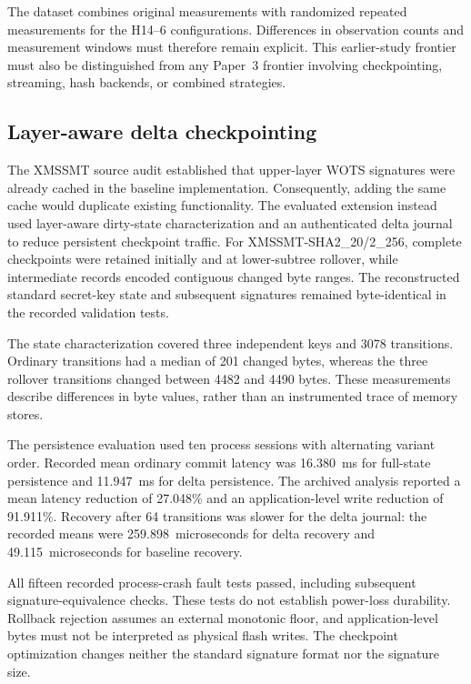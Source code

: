 \documentclass[pdflatex,sn-mathphys-num]{sn-jnl}
\begin{document}
The dataset combines original measurements with randomized repeated
measurements for the H14--6 configurations. Differences in observation
counts and measurement windows must therefore remain explicit.
This earlier-study frontier must also be distinguished from any
Paper~3 frontier involving checkpointing, streaming, hash backends,
or combined strategies.

\subsection{Layer-aware delta checkpointing}
\label{subsec:delta_checkpoint_review}

The XMSSMT source audit established that upper-layer WOTS signatures
were already cached in the baseline implementation. Consequently, adding
the same cache would duplicate existing functionality. The evaluated
extension instead used layer-aware dirty-state characterization and an
authenticated delta journal to reduce persistent checkpoint traffic.
For XMSSMT-SHA2\_20/2\_256, complete checkpoints were retained initially
and at lower-subtree rollover, while intermediate records encoded
contiguous changed byte ranges. The reconstructed standard secret-key
state and subsequent signatures remained byte-identical in the recorded
validation tests.

The state characterization covered three independent keys and 3078
transitions. Ordinary transitions had a median of 201 changed bytes,
whereas the three rollover transitions changed between 4482 and
4490 bytes. These measurements describe differences in byte values,
rather than an instrumented trace of memory stores.

The persistence evaluation used ten process sessions with alternating
variant order. Recorded mean ordinary commit latency was
16.380~ms for full-state persistence and 11.947~ms for delta persistence.
The archived analysis reported a mean latency reduction of 27.048\%
and an application-level write reduction of 91.911\%.
Recovery after 64 transitions was slower for the delta journal:
the recorded means were 259.898~microseconds for delta recovery and
49.115~microseconds for baseline recovery.

All fifteen recorded process-crash fault tests passed, including
subsequent signature-equivalence checks. These tests do not establish
power-loss durability. Rollback rejection assumes an external monotonic
floor, and application-level bytes must not be interpreted as physical
flash writes. The checkpoint optimization changes neither the standard
signature format nor the signature size.
\end{document}
